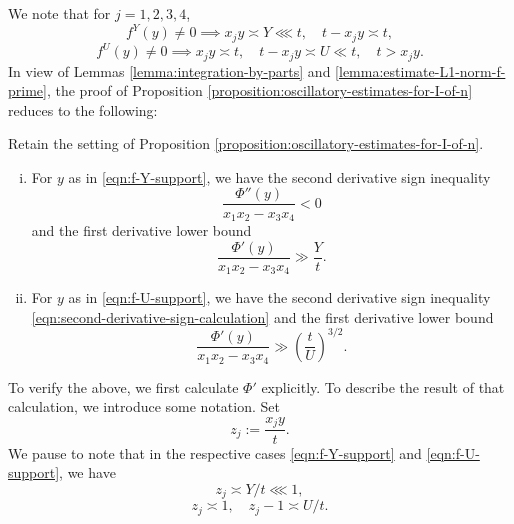 \documentclass[reqno]{amsart} 
\begin{document}
We note that for $j = 1,2,3,4$,
\begin{equation}\label{eqn:f-Y-support}
  f^Y(y) \neq 0 \implies x_j y \asymp Y \lll t, \quad t- x_j y \asymp t,
\end{equation}
\begin{equation}\label{eqn:f-U-support}
  f^U(y) \neq 0 \implies x_j y \asymp t, \quad t - x_j y \asymp U \ll t, \quad t > x_j y.
\end{equation}
In view of Lemmas \ref{lemma:integration-by-parts} and \ref{lemma:estimate-L1-norm-f-prime}, the proof of Proposition \ref{proposition:oscillatory-estimates-for-I-of-n} reduces to the following:
\begin{proposition}
  Retain the setting of  Proposition \ref{proposition:oscillatory-estimates-for-I-of-n}.
  \begin{enumerate}[(i)]
  \item For $y$ as in \eqref{eqn:f-Y-support}, we have the second derivative sign inequality
    \begin{equation}\label{eqn:second-derivative-sign-calculation}
      \frac{\Phi ''(y)}{x_1 x_2 - x_3 x_4} < 0
    \end{equation}
    and the first derivative lower bound
    \begin{equation}\label{eqn:Phi-prime-lower-bound-Y}
      \frac{\Phi '(y)}{x_1 x_2 - x_3 x_4} \gg \frac{Y}{t}.
    \end{equation}
  \item For $y$ as in \eqref{eqn:f-U-support}, we have the second derivative sign inequality \eqref{eqn:second-derivative-sign-calculation} and the first derivative lower bound
    \begin{equation}\label{eqn:Phi-prime-lower-bound-U}
      \frac{\Phi '(y)}{ x_1 x_2 - x_3 x_4} \gg \left( \frac{t}{U} \right) ^{3/2}.
    \end{equation}  
  \end{enumerate}
\end{proposition}
To verify the above, we first calculate $\Phi '$ explicitly.  To describe the result of that calculation, we introduce some notation.  Set
\begin{equation*}
  z_j := \frac{x _j y }{t }.
\end{equation*}
We pause to note that in the respective cases \eqref{eqn:f-Y-support} and \eqref{eqn:f-U-support}, we have
\begin{equation*}
  z_j \asymp Y/t \lll 1,
\end{equation*}
\begin{equation*}
  z_j \asymp 1, \quad z_j - 1 \asymp U/t.
\end{equation*}
\end{document}
